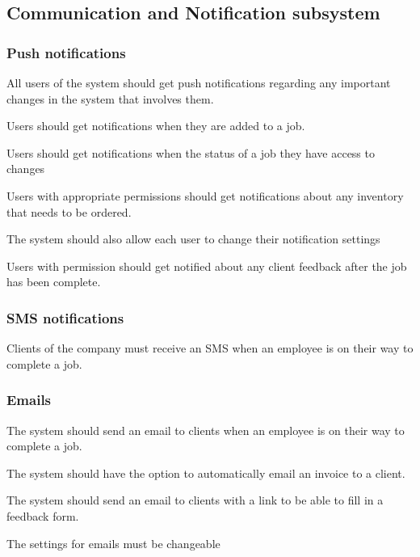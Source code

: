 \documentclass{article}
\begin{document}
	
	\subsection*{Communication and Notification subsystem}	
		\subsubsection*{Push notifications}	
		\begin{list}{R}{}
			\item All users of the system should get push notifications regarding any important changes in the system that involves them.
			\item Users should get notifications when they are added to a job.
			\item Users should get notifications when the status of a job they have access to changes
			\item Users with appropriate permissions should get notifications about any inventory that needs to be ordered.
			\item The system should also allow each user to change their notification settings
			\item Users with permission should get notified about any client feedback after the job has been complete.
		\end{list}
		
		\subsubsection*{SMS notifications}	
		\begin{list}{R.}{}
			\item Clients of the company must receive an SMS when an employee is on their way to complete a job.
		\end{list}
		
		\subsubsection*{Emails}	
		\begin{list}{R.}{}
			\item The system should send an email to clients when an employee is on their way to complete a job.
			\item The system should have the option to automatically email an invoice to a client.
			\item The system should send an email to clients with a link to be able to fill in a feedback form.
			\item The settings for emails must be changeable
		\end{list}
	
\end{document}

